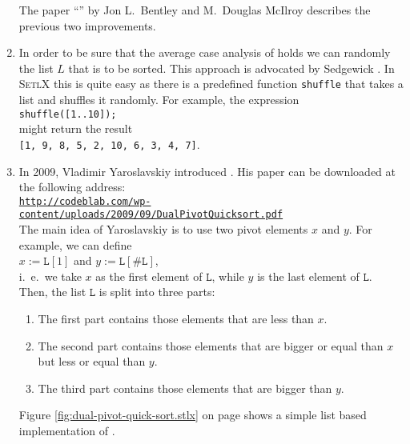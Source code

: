 \begin{enumerate}
      The paper ``'' by Jon L.~Bentley and M.~Douglas McIlroy
      \cite{bentley:93} describes the previous two improvements.
\item In order to be sure that the average case analysis of  holds we can randomly
       the list $L$ that is to be sorted.  This approach is advocated by Sedgewick
      \cite{sedgewick:2011}.  In \textsc{SetlX} this is quite easy as
      there is a predefined function \texttt{shuffle} that takes a list and shuffles it randomly.
      For example, the expression
      \\[0.2cm]
      \hspace*{1.3cm}
      \texttt{shuffle([1..10]);}
      \\[0.2cm]
      might return the result
      \\[0.2cm]
      \hspace*{1.3cm}
      \texttt{[1, 9, 8, 5, 2, 10, 6, 3, 4, 7]}.
\item In 2009, Vladimir Yaroslavskiy introduced  \cite{yaroslavskiy:2009}.  His paper can be
      downloaded at the following address:
      \\[0.2cm]
      \hspace*{-0.3cm}
      \href{http://codeblab.com/wp-content/uploads/2009/09/DualPivotQuicksort.pdf}{\texttt{http://codeblab.com/wp-content/uploads/2009/09/DualPivotQuicksort.pdf}}
      \\[0.2cm]
      The main idea of Yaroslavskiy is to use two pivot elements $x$ and $y$.  For example, we can
      define
      \\[0.2cm]
      \hspace*{1.3cm}
      $x := \mathtt{L}[1]$ \quad and \quad $y := \mathtt{L}[\#\mathtt{L}]$,
      \\[0.2cm]
      i.~e.~we take $x$ as the first element of $\mathtt{L}$, while $y$ is the last element of
      $\mathtt{L}$.  Then, the list 
      $\mathtt{L}$ is split into three parts:
      \begin{enumerate}
      \item The first part contains those elements that are less than $x$.
      \item The second part contains those elements that are bigger or equal than $x$ but less or
            equal than $y$.
      \item The third part contains those elements that are bigger than $y$.
      \end{enumerate}
      Figure \ref{fig:dual-pivot-quick-sort.stlx} on page \pageref{fig:dual-pivot-quick-sort.stlx}
      shows a simple list based implementation of .




\end{enumerate}
